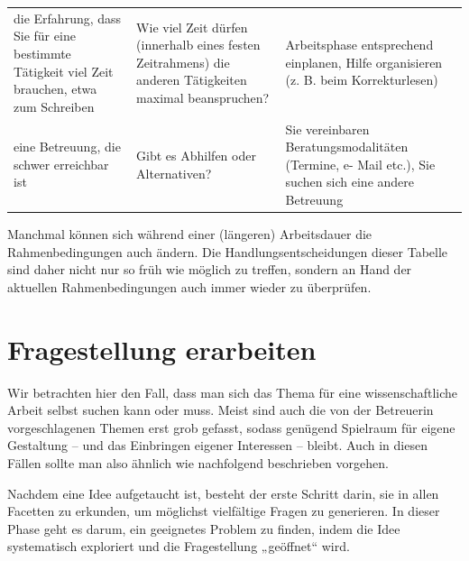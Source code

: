 \documentclass[]{book}
\theoremstyle{definition}
\theoremstyle{definition}
\theoremstyle{definition}
\theoremstyle{remark}
\begin{document}
\begin{longtable}[]{@{}lll@{}}
\begin{minipage}[t]{0.26\columnwidth}
die Erfahrung, dass Sie für eine bestimmte Tätigkeit viel Zeit brauchen,
etwa zum Schreiben\strut
\end{minipage} & \begin{minipage}[t]{0.30\columnwidth}\raggedright\strut
Wie viel Zeit dürfen (innerhalb eines festen Zeitrahmens) die anderen
Tätigkeiten maximal beanspruchen?\strut
\end{minipage} & \begin{minipage}[t]{0.35\columnwidth}\raggedright\strut
Arbeitsphase entsprechend einplanen, Hilfe organisieren (z. B. beim
Korrekturlesen)\vspace{5mm}\strut
\end{minipage}\tabularnewline
\begin{minipage}[t]{0.26\columnwidth}\raggedright\strut
eine Betreuung, die schwer erreichbar ist\strut
\end{minipage} & \begin{minipage}[t]{0.30\columnwidth}\raggedright\strut
Gibt es Abhilfen oder Alternativen?\strut
\end{minipage} & \begin{minipage}[t]{0.35\columnwidth}\raggedright\strut
Sie vereinbaren Beratungsmodalitäten (Termine, e- Mail etc.), Sie suchen
sich eine andere Betreuung\strut
\end{minipage}\tabularnewline
\bottomrule
\end{longtable}

Manchmal können sich während einer (längeren) Arbeitsdauer die
Rahmenbedingungen auch ändern. Die Handlungsentscheidungen dieser
Tabelle sind daher nicht nur so früh wie möglich zu treffen, sondern an
Hand der aktuellen Rahmenbedingungen auch immer wieder zu überprüfen.

\section{Fragestellung erarbeiten}\label{fragestellung-erarbeiten}

Wir betrachten hier den Fall, dass man sich das Thema für eine
wissenschaftliche Arbeit selbst suchen kann oder muss. Meist sind auch
die von der Betreuerin vorgeschlagenen Themen erst grob gefasst, sodass
genügend Spielraum für eigene Gestaltung -- und das Einbringen eigener
Interessen -- bleibt. Auch in diesen Fällen sollte man also ähnlich wie
nachfolgend beschrieben vorgehen.

Nachdem eine Idee aufgetaucht ist, besteht der erste Schritt darin, sie
in allen Facetten zu erkunden, um möglichst vielfältige Fragen zu
generieren. In dieser Phase geht es darum, ein geeignetes Problem zu
finden, indem die Idee systematisch exploriert und die Fragestellung
„geöffnet`` wird.
\end{document}
